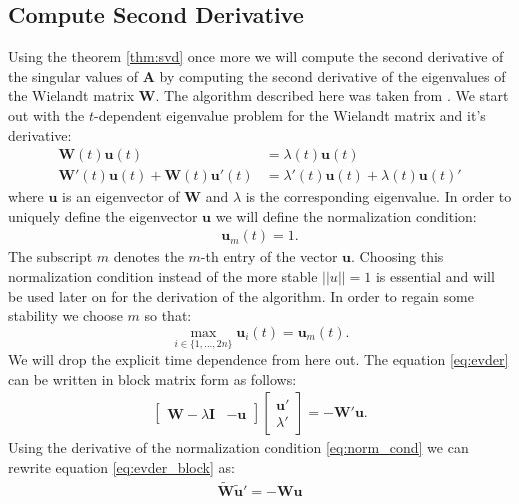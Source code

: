 \documentclass[a4paper, oneside]{discothesis}
\begin{document}
\subsection{Compute Second Derivative}
Using the theorem \ref{thm:svd} once more we will compute the second derivative of the singular values of $\mathbf{A}$ by computing the second derivative of the eigenvalues of the Wielandt matrix $\mathbf{W}$.
The algorithm described here was taken from \cite{doi:10.1002/nme.1620260202}.
We start out with the $t$-dependent eigenvalue problem for the Wielandt matrix and it's derivative:
\begin{align}
	\mathbf{W}(t)\mathbf{u}(t) &= \lambda(t)\mathbf{u}(t) \\
	\mathbf{W}'(t)\mathbf{u}(t) +
	\mathbf{W}(t)\mathbf{u}'(t) &=
	\lambda'(t)\mathbf{u}(t) +
	\lambda(t)\mathbf{u}(t)' \label{eq:evder}
\end{align}
where $\mathbf{u}$ is an eigenvector of $\mathbf{W}$ and $\lambda$ is the corresponding eigenvalue.
In order to uniquely define the eigenvector $\mathbf{u}$ we will define the normalization condition:
\begin{align}
	\mathbf{u}_m(t) = 1. \label{eq:norm_cond}
\end{align}
The subscript $m$ denotes the $m$-th entry of the vector $\mathbf{u}$.
Choosing this normalization condition instead of the more stable $||u|| = 1$ is essential and will be used later on for the derivation of the algorithm.
In order to regain some stability we choose $m$ so that:
\begin{equation}
	\max_{i \in \{1,...,2n\}} \mathbf{u}_i(t) = \mathbf{u}_m(t).
\end{equation}
We will drop the explicit time dependence from here out.
The equation \ref{eq:evder} can be written in block matrix form as follows:
\begin{align}
	\begin{bmatrix}
		\mathbf{W}-\lambda\mathbf{I} & -\mathbf{u}
	\end{bmatrix}
	\begin{bmatrix}
		\mathbf{u}' \\
		\lambda'
	\end{bmatrix} 
	= - \mathbf{W}'\mathbf{u}. \label{eq:evder_block}
\end{align}
Using the derivative of the normalization condition \ref{eq:norm_cond} we can rewrite equation \ref{eq:evder_block} as:
\begin{align}
	\mathbf{\tilde{W}} \mathbf{\tilde{u}}' = -\mathbf{W}\mathbf{u} \label{eq:firstder}
\end{align}
\end{document}

